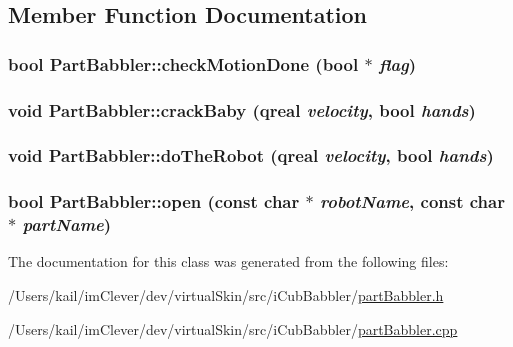 \subsection{Member Function Documentation}
\hypertarget{class_part_babbler_ac62a972e85492eaaa8cfc7dcd1c9488c}{
\subsubsection[{checkMotionDone}]{\setlength{\rightskip}{0pt plus 5cm}bool PartBabbler::checkMotionDone (bool $\ast$ {\em flag})}}
\label{class_part_babbler_ac62a972e85492eaaa8cfc7dcd1c9488c}
\hypertarget{class_part_babbler_a156d8ef91d4f8d4dfe02f9d8982c5d06}{
\subsubsection[{crackBaby}]{\setlength{\rightskip}{0pt plus 5cm}void PartBabbler::crackBaby (qreal {\em velocity}, \/  bool {\em hands})}}
\label{class_part_babbler_a156d8ef91d4f8d4dfe02f9d8982c5d06}
\hypertarget{class_part_babbler_a16e6e6a7582a5fb5903604691de52070}{
\subsubsection[{doTheRobot}]{\setlength{\rightskip}{0pt plus 5cm}void PartBabbler::doTheRobot (qreal {\em velocity}, \/  bool {\em hands})}}
\label{class_part_babbler_a16e6e6a7582a5fb5903604691de52070}
\hypertarget{class_part_babbler_a9a1ff8917964eab2e95711dd9e0594e8}{
\subsubsection[{open}]{\setlength{\rightskip}{0pt plus 5cm}bool PartBabbler::open (const char $\ast$ {\em robotName}, \/  const char $\ast$ {\em partName})}}
\label{class_part_babbler_a9a1ff8917964eab2e95711dd9e0594e8}


The documentation for this class was generated from the following files:\begin{DoxyCompactItemize}
\item 
/Users/kail/imClever/dev/virtualSkin/src/iCubBabbler/\hyperlink{part_babbler_8h}{partBabbler.h}\item 
/Users/kail/imClever/dev/virtualSkin/src/iCubBabbler/\hyperlink{part_babbler_8cpp}{partBabbler.cpp}\end{DoxyCompactItemize}
